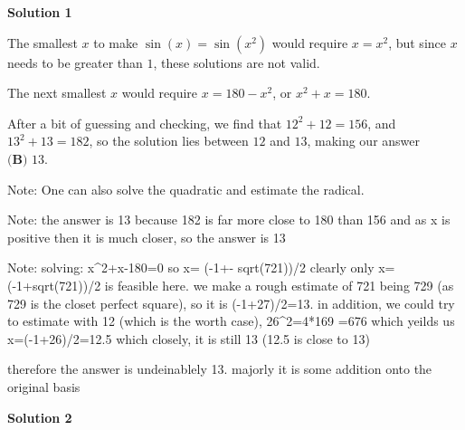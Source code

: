 \begin{enumerate}
\textbf{Solution 1}

The smallest $x$ to make $\sin(x) = \sin(x^2)$ would require $x=x^2$, but since $x$ needs to be greater than $1$, these solutions are not valid.

 The next smallest $x$ would require $x=180-x^2$, or $x^2+x=180$. 

 After a bit of guessing and checking, we find that $12^2+12=156$, and $13^2+13=182$, so the solution lies between $12{ }$ and $13$, making our answer $\boxed{\textbf{(B) } 13}.$

 Note: One can also solve the quadratic and estimate the radical.

 Note: the answer is 13 because 182 is far more close to 180 than 156 and as x is positive then it is much closer, so the answer is 13

 Note: solving: x\textasciicircum{}2+x-180=0 so x= (-1+- sqrt(721))/2 clearly only x= (-1+sqrt(721))/2 is feasible here. we make a rough estimate of 721 being 729 (as 729 is the closet perfect square),  so it is (-1+27)/2=13.    in addition, we could try to estimate with 12 (which is the worth case),   26\textasciicircum{}2=4*169 =676 which yeilds us x=(-1+26)/2=12.5 which closely, it is still 13 (12.5 is close to 13) 

 therefore the answer is undeinablely 13. majorly it is some addition onto the original basis

 



\textbf{Solution 2}


\end{enumerate}
